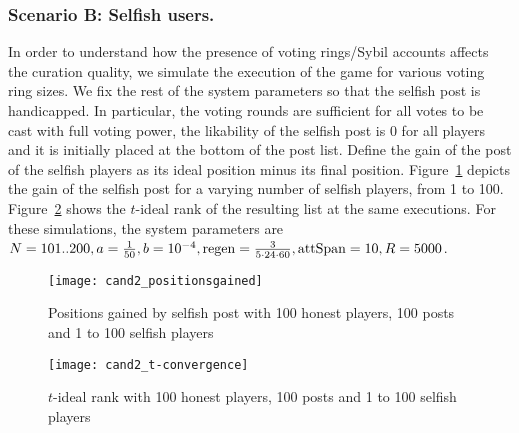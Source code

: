     \subsubsection{Scenario B: Selfish users.}
      In order to understand how the presence of voting rings/Sybil accounts
      affects the curation quality, we simulate the execution of the game for
      various voting ring sizes. We fix the rest of the system parameters so
      that the selfish post is handicapped. In particular, the voting rounds are
      sufficient for all votes to be cast with full voting power, the likability
      of the selfish post is 0 for all players and it is initially placed at the
      bottom of the post list. Define the gain of the post of the selfish
      players as its ideal position minus its final position.
      Figure~\ref{fig:selfish:gain} depicts the gain of the selfish post for a
      varying number of selfish players, from 1 to 100.
      Figure~\ref{fig:selfish:tideal} shows the $t$-ideal rank of the resulting
      list at the same executions. For these simulations, the system parameters
      are $N = 101 .. 200, a = \frac{1}{50}, b = 10^{-4}, \mathrm{regen} =
      \frac{3}{5 \cdot 24 \cdot 60}, \mathrm{attSpan} = 10, R = 5000$.

      \begin{figure}[!htbp]
        \texttt{[image: cand2\_positionsgained]}
        \caption{Positions gained by selfish post with 100 honest players, 100
        posts and 1 to 100 selfish players}
        \label{fig:selfish:gain}
      \end{figure}

      \begin{figure}[!htbp]
        \texttt{[image: cand2\_t-convergence]}
        \caption{$t$-ideal rank with 100 honest players, 100 posts and 1 to 100
        selfish players}
        \label{fig:selfish:tideal}
      \end{figure}
